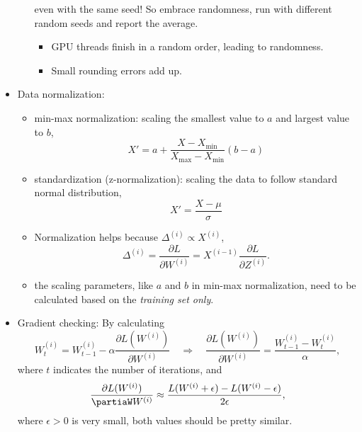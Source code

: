 \documentclass[twocolumn,landscape,10pt]{article}
\theoremstyle{definition}
\begin{document}
\begin{itemize}
\begin{itemize}
                even with the same seed! So embrace randomness, run with
                different random seeds and report the average.
                \begin{itemize}
                    \item GPU threads finish in a random order, leading to
                        randomness.
                    \item Small rounding errors add up.
                \end{itemize} 
        \end{itemize} 
    \item Data normalization:
        \begin{itemize}
            \item min-max normalization: scaling the smallest value to $a$ and
                largest value to $b$,
                \[
                    X' = a +
                    \frac{X-X_\text{min}}{X_\text{max}-X_\text{min}}(b-a)
                \]
            \item standardization (z-normalization): scaling the data to follow
                standard normal distribution,
                \[
                    X'=\frac{X-\mu}{\sigma}
                \]
            \item Normalization helps because $\Delta^{(i)}\propto X^{(i)}$,
                \[
                    \Delta^{(i)}=\frac{\partial L}{\partial
                    W^{(i)}}=X^{(i-1)}\frac{\partial L}{\partial Z^{(i)}}.
                \]
            \item the scaling parameters, like $a$ and $b$ in min-max
                normalization, need to be calculated based on the 
                \emph{training set only}.
        \end{itemize} 
    \item Gradient checking: By calculating
            \[
                W^{(i)}_t = W^{(i)}_{t-1} - \alpha
               \frac{\partial L(W^{(i)})}{\partial W^{(i)}}
               \quad\Longrightarrow\quad
               \frac{\partial L(W^{(i)})}{\partial W^{(i)}}
                =\frac{W^{(i)}_{t-1}-W^{(i)}_t}{\alpha},
            \]
            where $t$ indicates the number of iterations, and
            \[
                \frac{\partial L(W^{(i)})}{\partiaW W^{(i)}}
                \approx \frac{L(W^{(i)} + \epsilon)-L(W^{(i)} -
                \epsilon)}{2\epsilon},
            \]
            where $\epsilon>0$ is very small, both values should be pretty
            similar.
\end{itemize} 
\end{document}
